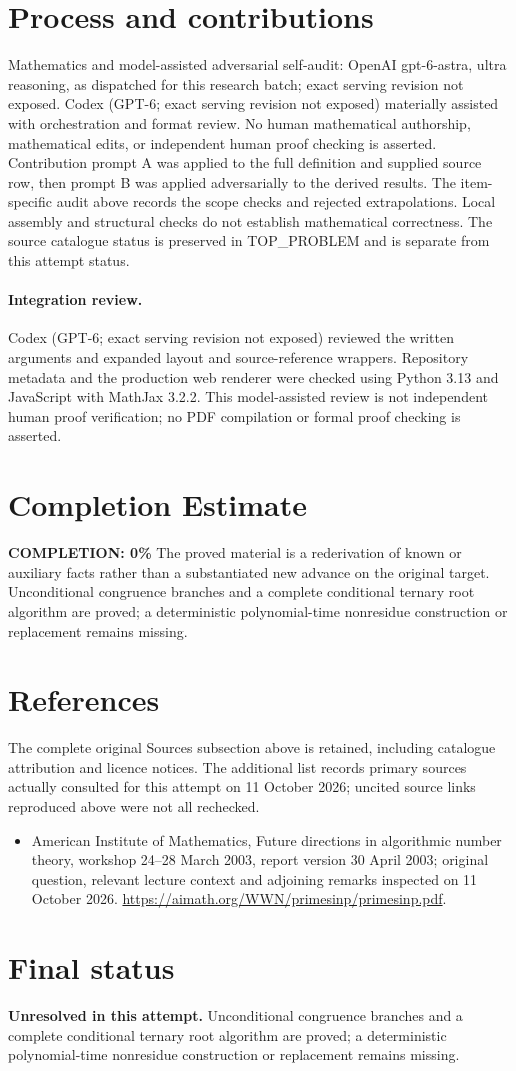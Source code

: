 \documentclass[11pt]{article}
\begin{document}
\section{Process and contributions}
Mathematics and model-assisted adversarial self-audit: OpenAI gpt-6-astra, ultra reasoning, as dispatched for this research batch; exact serving revision not exposed. Codex (GPT-6; exact serving revision not exposed) materially assisted with orchestration and format review. No human mathematical authorship, mathematical edits, or independent human proof checking is asserted.
Contribution prompt A was applied to the full definition and supplied source row, then prompt B was applied adversarially to the derived results. The item-specific audit above records the scope checks and rejected extrapolations. Local assembly and structural checks do not establish mathematical correctness. The source catalogue status is preserved in TOP\_PROBLEM and is separate from this attempt status.
\paragraph{Integration review.} Codex (GPT-6; exact serving revision not exposed) reviewed the written arguments and expanded layout and source-reference wrappers. Repository metadata and the production web renderer were checked using Python 3.13 and JavaScript with MathJax 3.2.2. This model-assisted review is not independent human proof verification; no PDF compilation or formal proof checking is asserted.

\section{Completion Estimate}
\noindent\textbf{COMPLETION: 0\%}
The proved material is a rederivation of known or auxiliary facts rather than a substantiated new advance on the original target. Unconditional congruence branches and a complete conditional ternary root algorithm are proved; a deterministic polynomial-time nonresidue construction or replacement remains missing.
\section{References}
The complete original Sources subsection above is retained, including catalogue attribution and licence notices. The additional list records primary sources actually consulted for this attempt on 11 October 2026; uncited source links reproduced above were not all rechecked.
\begin{itemize}
\item American Institute of Mathematics, Future directions in algorithmic number theory, workshop 24--28 March 2003, report version 30 April 2003; original question, relevant lecture context and adjoining remarks inspected on 11 October 2026. \url{https://aimath.org/WWN/primesinp/primesinp.pdf}.
\end{itemize}
\section{Final status}
\textbf{Unresolved in this attempt.} Unconditional congruence branches and a complete conditional ternary root algorithm are proved; a deterministic polynomial-time nonresidue construction or replacement remains missing.
\end{document}
